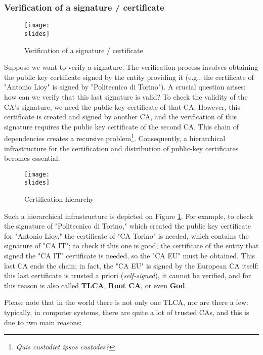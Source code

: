 \subsubsection*{Verification of a signature / certificate}

\begin{figure}[h]
    \centering
    \texttt{[image: \\slides]}
    \caption{Verification of a signature / certificate}
\end{figure}

Suppose we want to verify a signature. The verification process involves obtaining the public key certificate signed by the entity providing it (e.g., the certificate of "Antonio Lioy" is signed by "Politecnico di Torino"). A crucial question arises: how can we verify that this last signature is valid? To check the validity of the CA's signature, we need the public key certificate of that CA. However, this certificate is created and signed by another CA, and the verification of this signature requires the public key certificate of the second CA. This chain of dependencies creates a recursive problem\footnote{\textit{Quis custodiet ipsos custodes?}}. 
Consequently, a hierarchical infrastructure for the certification and distribution of public-key certificates becomes essential.


\begin{figure}[h]
    \centering
    \texttt{[image: \\slides]}
    \caption{Certification hierarchy}
    \label{fig:certification-hierarchy}
\end{figure}

Such a hierarchical infrastructure is depicted on Figure \ref{fig:certification-hierarchy}. 
For example, to check the signature of "Politecnico di Torino," which created the public key certificate for "Antonio Lioy," the certificate of "CA Torino" is needed, which contains the signature of "CA IT"; to check if this one is good, the certificate of the entity that signed the "CA IT" certificate is needed, so the "CA EU" must be obtained. 
This last CA ends the chain; in fact, the "CA EU" is signed by the European CA itself: this last certificate is trusted a priori (\textit{self-signed}), it cannot be verified, and for this reason is also called \textbf{TLCA}, \textbf{Root CA}, or even \textbf{God}.

Please note that in the world there is not only one TLCA, nor are there a few: typically, in computer systems, there are quite a lot of trusted CAs, and this is due to two main reasons:


